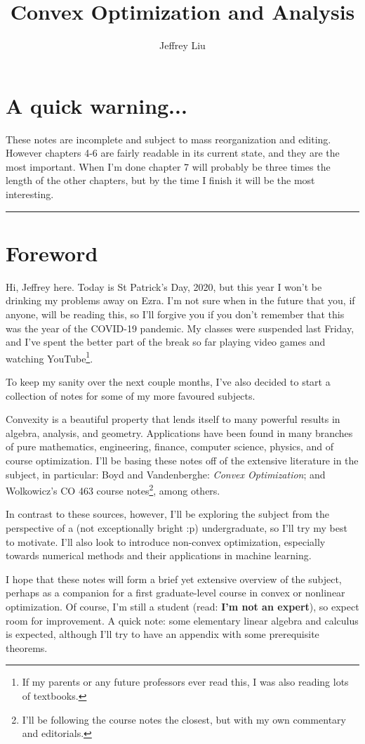 \documentclass[11pt]{article}
\title{Convex Optimization and Analysis}
\author{Jeffrey Liu}
\date{}
\numberwithin{equation}{section}
\theoremstyle{definition}
\begin{document}
\BgThispage
\maketitle
\thispagestyle{empty}
\clearpage
\section*{A quick warning...}
These notes are incomplete and subject to mass reorganization and editing. However chapters 4-6 are fairly readable in its current state, and they are the most important. When I'm done chapter 7 will probably be three times the length of the other chapters, but by the time I finish it will be the most interesting.
\clearpage
\hrule
\section*{Foreword}
Hi, Jeffrey here. Today is St Patrick's Day, 2020, but this year I won't be  drinking my problems away on Ezra. I'm not sure when in the future that you, if anyone, will be reading this, so I'll forgive you if you don't remember that this was the year of the COVID-19 pandemic. My classes were suspended last Friday, and I've spent the better part of the break so far playing video games and watching YouTube\footnote{If my parents or any future professors ever read this, I was also reading lots of textbooks.}.

To keep my sanity over the next couple months, I've also decided to start a collection of notes for some of my more favoured subjects.

Convexity is a beautiful property that lends itself to many powerful results in algebra, analysis, and geometry. Applications have been found in many branches of pure mathematics, engineering, finance, computer science, physics, and of course optimization. I'll be basing these notes off of the extensive literature in the subject, in particular: Boyd and Vandenberghe: \textit{Convex Optimization}; and Wolkowicz's CO 463 course notes\footnote{I'll be following the course notes the closest, but with my own commentary and editorials.}, among others.

In contrast to these sources, however, I'll be exploring the subject from the perspective of a (not exceptionally bright :p) undergraduate, so I'll try my best to motivate. I'll also look to introduce non-convex optimization, especially towards numerical methods and their applications in machine learning.

I hope that these notes will form a brief yet extensive overview of the subject, perhaps as a companion for a first graduate-level course in convex or nonlinear optimization. Of course, I'm still a student (read: \textbf{I'm not an expert}), so expect room for improvement. A quick note: some elementary linear algebra and calculus is expected, although I'll try to have an appendix with some prerequisite
theorems.
\end{document}
